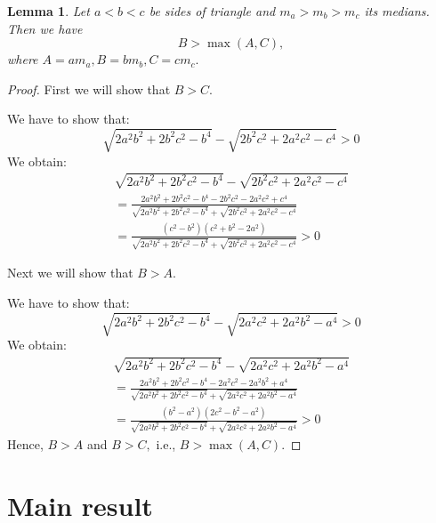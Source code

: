 \documentclass[a4paper,12pt]{article}
\newtheorem{lemma}{Lemma}
\begin{document}
\begin{lemma}\label{order} Let $a<b<c$ be sides of triangle and $m_a>m_b>m_c$ its medians. Then we have
\begin{equation}
B > \max(A,C),
\end{equation}
where $A=a m_a, B=b m_b, C=c m_c.$
\end{lemma}
\begin{proof}
First we will show that $B>C.$ 

We have to show that:
\[
\sqrt{2a^2b^2+2b^2c^2-b^4} -\sqrt{2b^2c^2+2a^2c^2-c^4} >0
\]
We obtain:
\begin{align*}
\sqrt{2a^2b^2+2b^2c^2-b^4} -\sqrt{2b^2c^2+2a^2c^2-c^4} \\
=\frac{2a^2b^2+2b^2c^2-b^4 -2b^2c^2-2a^2c^2+c^4}{\sqrt{2a^2b^2+2b^2c^2-b^4} +\sqrt{2b^2c^2+2a^2c^2-c^4}}\\
=\frac{(c^2-b^2)(c^2+b^2-2a^2)}{\sqrt{2a^2b^2+2b^2c^2-b^4} +\sqrt{2b^2c^2+2a^2c^2-c^4}}>0
\end{align*}

Next we will show that $B>A.$

We have to show that:
\[
\sqrt{2a^2b^2+2b^2c^2-b^4} -\sqrt{2a^2c^2+2a^2b^2-a^4} >0
\]
We obtain:
\begin{align*}
\sqrt{2a^2b^2+2b^2c^2-b^4} -\sqrt{2a^2c^2+2a^2b^2-a^4} \\
=\frac{2a^2b^2+2b^2c^2-b^4 -2a^2c^2-2a^2b^2+a^4}{\sqrt{2a^2b^2+2b^2c^2-b^4} +\sqrt{2a^2c^2+2a^2b^2-a^4}}\\
=\frac{(b^2-a^2)(2c^2-b^2 -a^2)}{\sqrt{2a^2b^2+2b^2c^2-b^4} +\sqrt{2a^2c^2+2a^2b^2-a^4}}>0
\end{align*}
Hence, $B>A$ and $B>C,$ i.e., $B>\max(A,C).$
\end{proof}

\section{Main result}
\end{document}
